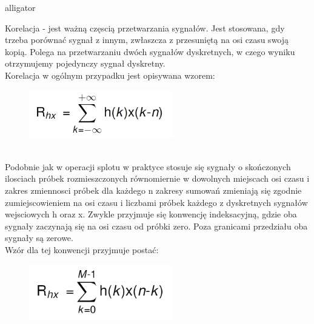 \documentclass[12pt]{article}
\begin{document}
\begin{labeling}{alligator}
\item [Korelacja] - jest ważną częscią przetwarzania sygnałów. Jest stosowana, gdy trzeba porównać sygnał z innym, zwłaszcza z przesuniętą na osi czasu swoją kopią.
Polega na przetwarzaniu dwóch sygnałów dyskretnych, w czego wyniku otrzymujemy pojedynczy sygnał dyskretny.
\\Korelacja w ogólnym przypadku jest opisywana wzorem:
\begin{figure}[h!]
 \centering
 \includegraphics[width=6.3cm]{kor.PNG}
 \vspace{-0.3cm}
 \label{Widok_aplikacjis}
\end{figure}
\\Podobnie jak w operacji splotu w praktyce stosuje się sygnały o skończonych ilosciach próbek rozmieszczonych równomiernie w dowolnych miejscach osi czasu i zakres zmiennosci próbek dla każdego n zakresy sumowań zmieniają się zgodnie zumiejscowieniem na osi czasu i liczbami próbek każdego z dyskretnych sygnałów wejsciowych h oraz x. Zwykle przyjmuje się konwencję indeksacyjną, gdzie oba sygnały zaczynają się  na osi czasu od próbki zero. Poza granicami przedziału oba sygnały są zerowe. 
\\Wzór dla tej konwencji przyjmuje postać: 
\begin{figure}[h!]
 \centering
 \includegraphics[width=6.3cm]{korW.PNG}
 \vspace{-0.3cm}
 \label{Splot_indeks}
\end{figure}


\end{labeling}

\end{document}
